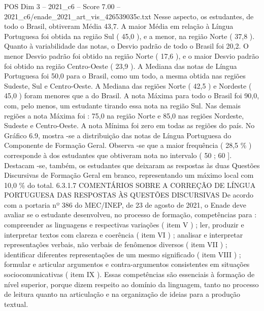 \begin{textsample}{POS Dim 3 – 2021\_c6 – Score 7.00 – 2021\_c6/enade\_2021\_art\_vis\_426539035c.txt}
Nesse aspecto, os estudantes, de todo o Brasil, obtiveram Média 43,7.
A maior Média em relação à Língua Portuguesa foi obtida na região Sul ( 45,0 ), e a menor, na região Norte ( 37,8 ).
Quanto à variabilidade das notas, o Desvio padrão de todo o Brasil foi 20,2.
O menor Desvio padrão foi obtido na região Norte ( 17,6 ), e o maior Desvio padrão foi obtido na região Centro-Oeste ( 23,9 ).
A Mediana das notas de Língua Portuguesa foi 50,0 para o Brasil, como um todo, a mesma obtida nas regiões Sudeste, Sul e Centro-Oeste.
A Mediana das regiões Norte ( 42,5 ) e Nordeste ( 45,0 ) foram menores que a do Brasil.
A nota Máxima para todo o Brasil foi 90,0, com, pelo menos, um estudante tirando essa nota na região Sul.
Nas demais regiões a nota Máxima foi : 75,0 na região Norte e 85,0 nas regiões Nordeste, Sudeste e Centro-Oeste.
A nota Mínima foi zero em todas as regiões do país.
No Gráfico 6.9, mostra -se a distribuição das notas de Língua Portuguesa do Componente de Formação Geral.
Observa -se que a maior frequência ( 28,5 \% ) corresponde à dos estudantes que obtiveram nota no intervalo ( 50 ; 60 ].
Destacam -se, também, os estudantes que deixaram as respostas às duas Questões Discursivas de Formação Geral em branco, representando um máximo local com 10,0 \% do total. 6.3.1.7 COMENTÁRIOS SOBRE A CORREÇÃO DE LÍNGUA PORTUGUESA DAS RESPOSTAS ÀS QUESTÕES DISCURSIVAS De acordo com a portaria nº 386 do MEC/INEP, de 23 de agosto de 2021, o Enade deve avaliar se o estudante desenvolveu, no processo de formação, competências para : compreender as linguagens e respectivas variações ( item V ) ; ler, produzir e interpretar textos com clareza e coerência ( item VI ) ; analisar e interpretar representações verbais, não verbais de fenômenos diversos ( item VII ) ; identificar diferentes representações de um mesmo significado ( item VIII ) ; formular e articular argumentos e contra-argumentos consistentes em situações sociocomunicativas ( item IX ).
Essas competências são essenciais à formação de nível superior, porque dizem respeito ao domínio da linguagem, tanto no processo de leitura quanto na articulação e na organização de ideias para a produção textual.

\end{textsample}
